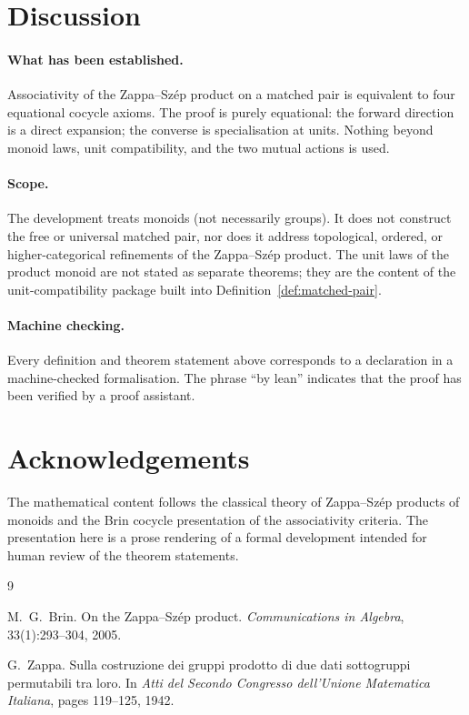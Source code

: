 \documentclass[11pt,a4paper]{article}
\theoremstyle{plain}
\theoremstyle{definition}
\begin{document}
\section{Discussion}

\paragraph{What has been established.}
Associativity of the Zappa--Sz\'{e}p product on a matched pair is equivalent to
four equational cocycle axioms. The proof is purely equational: the forward
direction is a direct expansion; the converse is specialisation at units.
Nothing beyond monoid laws, unit compatibility, and the two mutual actions is
used.

\paragraph{Scope.}
The development treats monoids (not necessarily groups). It does not construct
the free or universal matched pair, nor does it address topological, ordered,
or higher-categorical refinements of the Zappa--Sz\'{e}p product. The unit
laws of the product monoid are not stated as separate theorems; they are the
content of the unit-compatibility package built into
Definition~\ref{def:matched-pair}.

\paragraph{Machine checking.}
Every definition and theorem statement above corresponds to a declaration in a
machine-checked formalisation. The phrase ``by lean'' indicates that the proof
has been verified by a proof assistant.

\section*{Acknowledgements}

The mathematical content follows the classical theory of Zappa--Sz\'{e}p
products of monoids and the Brin cocycle presentation of the associativity
criteria. The presentation here is a prose rendering of a formal development
intended for human review of the theorem statements.

\begin{thebibliography}{9}

M.~G.~Brin.
\newblock On the Zappa--Sz\'{e}p product.
\newblock \emph{Communications in Algebra}, 33(1):293--304, 2005.

G.~Zappa.
\newblock Sulla costruzione dei gruppi prodotto di due dati sottogruppi
  permutabili tra loro.
\newblock In \emph{Atti del Secondo Congresso dell'Unione Matematica
  Italiana}, pages 119--125, 1942.

\end{thebibliography}
\end{document}
